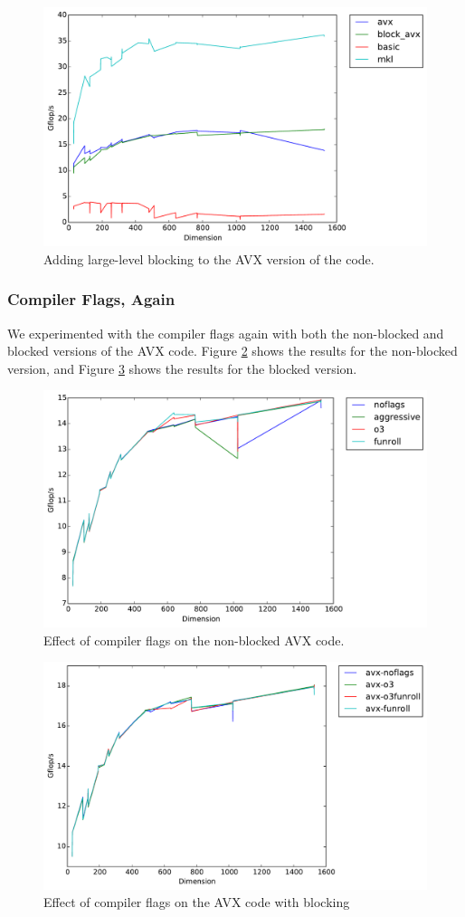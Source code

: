 \documentclass[letterpaper]{article}	 %
\begin{document}
\begin{figure}[H]
	\centering
	\includegraphics[width=.6\linewidth]{timing-avx_blocked.pdf}
	\caption{Adding large-level blocking to the AVX version of the code.}
	\label{fig:avx-blocked}
\end{figure}

\subsubsection{Compiler Flags, Again}
We experimented with the compiler flags again with both the non-blocked and blocked versions of the AVX code. Figure \ref{fig:avx-flags-noblocking} shows the results for the non-blocked version, and Figure \ref{fig:avx-flags-blocking} shows the results for the blocked version. 

\begin{figure}[H]
	\centering
	\includegraphics[width=.6\linewidth]{timing-flags_noblocking.pdf}
	\caption{Effect of compiler flags on the non-blocked AVX code.}
	\label{fig:avx-flags-noblocking}
\end{figure}

\begin{figure}[H]
	\centering
	\includegraphics[width=.6\linewidth]{timing-flags_blocking.pdf}
	\caption{Effect of compiler flags on the AVX code with blocking}
	\label{fig:avx-flags-blocking}
\end{figure}
\end{document}
